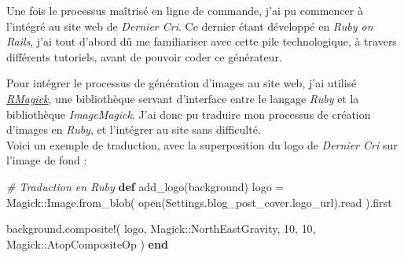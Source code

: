 \documentclass[12pt,a4paper]{article}
\newenvironment{Shaded}{}{}
\newcommand{\KeywordTok}[1]{\textcolor[rgb]{0.00,0.44,0.13}{\textbf{{#1}}}}
\newcommand{\DataTypeTok}[1]{\textcolor[rgb]{0.56,0.13,0.00}{{#1}}}
\newcommand{\DecValTok}[1]{\textcolor[rgb]{0.25,0.63,0.44}{{#1}}}
\newcommand{\CommentTok}[1]{\textcolor[rgb]{0.38,0.63,0.69}{\textit{{#1}}}}
\newcommand{\VariableTok}[1]{\textcolor[rgb]{0.10,0.09,0.49}{{#1}}}
\newcommand{\ExtensionTok}[1]{{#1}}
\newcommand{\NormalTok}[1]{{#1}}
\begin{document}
  \bigskip

  Une fois le processus maîtrisé en ligne de commande, j'ai pu commencer à
  l'intégré au site web de \emph{Dernier Cri}. Ce dernier étant développé
  en \emph{Ruby on Rails}, j'ai tout d'abord dû me familiariser avec cette
  pile technologique, à travers différents tutoriels, avant de pouvoir
  coder ce générateur.

  \bigskip

  Pour intégrer le processus de génération d'images au site web, j'ai
  utilisé \href{https://github.com/rmagick/rmagick}{\emph{RMagick}}, une
  bibliothèque servant d'interface entre le langage \emph{Ruby} et la
  bibliothèque \emph{ImageMagick}. J'ai donc pu traduire mon processus de
  création d'images en \emph{Ruby}, et l'intégrer au site sans
  difficulté.\\
  Voici un exemple de traduction, avec la superposition du logo de
  \emph{Dernier Cri} sur l'image de fond :

  \begin{Shaded}
  \end{Shaded}

  \begin{Shaded}
  \begin{Highlighting}[]
  \CommentTok{# Traduction en Ruby}
  \KeywordTok{def} \NormalTok{add_logo(background)}
    \NormalTok{logo = }\DataTypeTok{Magick}\NormalTok{::}\DataTypeTok{Image}\NormalTok{.from_blob(}
      \NormalTok{open(}\DataTypeTok{Settings}\NormalTok{.blog_post_cover.logo_url).read}
    \NormalTok{).first}

    \NormalTok{background.composite!(}
      \NormalTok{logo,}
      \DataTypeTok{Magick}\NormalTok{::}\DataTypeTok{NorthEastGravity}\NormalTok{,}
      \DecValTok{10}\NormalTok{,}
      \DecValTok{10}\NormalTok{,}
      \DataTypeTok{Magick}\NormalTok{::}\DataTypeTok{AtopCompositeOp}
    \NormalTok{)}
  \KeywordTok{end}
  \end{Highlighting}
  \end{Shaded}
\end{document}
